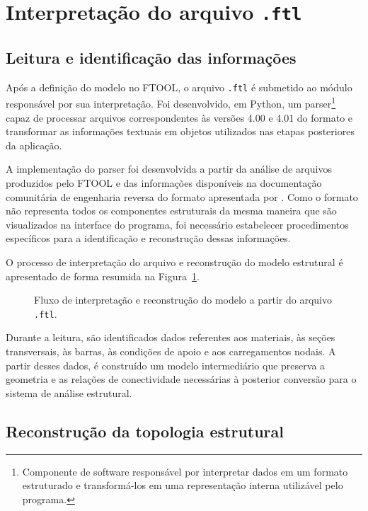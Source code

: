 \section{Interpretação do arquivo \texttt{.ftl}}

\subsection{Leitura e identificação das informações}
\label{sec:metodologia-parser}

Após a definição do modelo no \acrshort{FTOOL}, o arquivo \texttt{.ftl} é submetido ao módulo responsável por sua interpretação. Foi desenvolvido, em Python, um parser\footnote{Componente de software responsável por interpretar dados em um formato estruturado e transformá-los em uma representação interna utilizável pelo programa.} capaz de processar arquivos correspondentes às versões 4.00 e 4.01 do formato e transformar as informações textuais em objetos utilizados nas etapas posteriores da aplicação.

A implementação do parser foi desenvolvida a partir da análise de arquivos produzidos pelo \acrshort{FTOOL} e das informações disponíveis na documentação comunitária de engenharia reversa do formato apresentada por . Como o formato não representa todos os componentes estruturais da mesma maneira que são visualizados na interface do programa, foi necessário estabelecer procedimentos específicos para a identificação e reconstrução dessas informações.

O processo de interpretação do arquivo e reconstrução do modelo estrutural é apresentado de forma resumida na Figura~\ref{fig:fluxo-parser-ftl}.
\begin{figure}[H]
    \centering
    \caption{Fluxo de interpretação e reconstrução do modelo a partir do arquivo \texttt{.ftl}.}
    \label{fig:fluxo-parser-ftl}
    
\end{figure}

Durante a leitura, são identificados dados referentes aos materiais, às seções transversais, às barras, às condições de apoio e aos carregamentos nodais. A partir desses dados, é construído um modelo intermediário que preserva a geometria e as relações de conectividade necessárias à posterior conversão para o sistema de análise estrutural.

\subsection{Reconstrução da topologia estrutural}
\label{subsec:reconstrucao-topologia}


